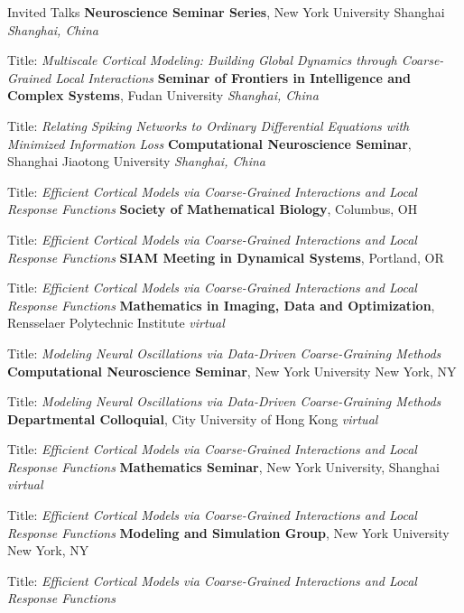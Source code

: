 \begin{rubric}{Invited Talks}
\entry*[2024.05]%
        \textbf{Neuroscience Seminar Series}, New York University Shanghai \hfill \textit{Shanghai, China}
	\par Title: \textit{Multiscale Cortical Modeling: Building Global Dynamics through Coarse-Grained Local Interactions}
\entry*[2024.04]%
        \textbf{Seminar of Frontiers in Intelligence and Complex Systems}, Fudan University \hfill \textit{Shanghai, China}
	\par Title: \textit{Relating Spiking Networks to Ordinary Differential Equations with Minimized Information Loss} 
 \entry*[2024.03]%
        \textbf{Computational Neuroscience Seminar}, Shanghai Jiaotong University \hfill \textit{Shanghai, China}
	\par Title: \textit{Efficient Cortical Models via Coarse-Grained Interactions and Local Response Functions} 
\entry*[2023.07]%
	\textbf{Society of Mathematical Biology}, \hfill Columbus, OH
	\par Title: \textit{Efficient Cortical Models via Coarse-Grained Interactions and Local Response Functions}
\entry*[2023.05]%
	\textbf{SIAM Meeting in Dynamical Systems}, \hfill Portland, OR
	\par Title: \textit{Efficient Cortical Models via Coarse-Grained Interactions and Local Response Functions}
\entry*[2023.05]%
	\textbf{Mathematics in Imaging, Data and Optimization}, Rensselaer Polytechnic Institute \hfill \textit{virtual}
	\par Title: \textit{Modeling Neural Oscillations via Data-Driven Coarse-Graining Methods} 
\entry*[2023.05]%
	\textbf{Computational Neuroscience Seminar}, New York University \hfill New York, NY
	\par Title: \textit{Modeling Neural Oscillations via Data-Driven Coarse-Graining Methods}
\entry*[2023.04]%
	\textbf{Departmental Colloquial}, City University of Hong Kong \hfill \textit{virtual}
	\par Title: \textit{Efficient Cortical Models via Coarse-Grained Interactions and Local Response Functions}
 \entry*[2023.03]%
	\textbf{Mathematics Seminar}, New York University, Shanghai \hfill \textit{virtual}
	\par Title: \textit{Efficient Cortical Models via Coarse-Grained Interactions and Local Response Functions}
  \entry*[2023.02]%
	\textbf{Modeling and Simulation Group}, New York University \hfill New York, NY
	\par Title: \textit{Efficient Cortical Models via Coarse-Grained Interactions and Local Response Functions}

\end{rubric}

